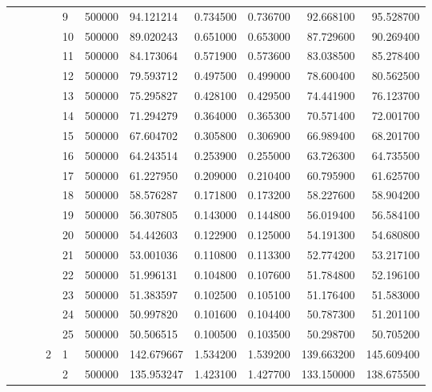\begin{tabular}{lllllllrrrr}
\cline{5-11}
 &  &  &  & 9 & 500000 & 94.121214 & 0.734500 & 0.736700 & 92.668100 & 95.528700 \\
\cline{5-11}
 &  &  &  & 10 & 500000 & 89.020243 & 0.651000 & 0.653000 & 87.729600 & 90.269400 \\
\cline{5-11}
 &  &  &  & 11 & 500000 & 84.173064 & 0.571900 & 0.573600 & 83.038500 & 85.278400 \\
\cline{5-11}
 &  &  &  & 12 & 500000 & 79.593712 & 0.497500 & 0.499000 & 78.600400 & 80.562500 \\
\cline{5-11}
 &  &  &  & 13 & 500000 & 75.295827 & 0.428100 & 0.429500 & 74.441900 & 76.123700 \\
\cline{5-11}
 &  &  &  & 14 & 500000 & 71.294279 & 0.364000 & 0.365300 & 70.571400 & 72.001700 \\
\cline{5-11}
 &  &  &  & 15 & 500000 & 67.604702 & 0.305800 & 0.306900 & 66.989400 & 68.201700 \\
\cline{5-11}
 &  &  &  & 16 & 500000 & 64.243514 & 0.253900 & 0.255000 & 63.726300 & 64.735500 \\
\cline{5-11}
 &  &  &  & 17 & 500000 & 61.227950 & 0.209000 & 0.210400 & 60.795900 & 61.625700 \\
\cline{5-11}
 &  &  &  & 18 & 500000 & 58.576287 & 0.171800 & 0.173200 & 58.227600 & 58.904200 \\
\cline{5-11}
 &  &  &  & 19 & 500000 & 56.307805 & 0.143000 & 0.144800 & 56.019400 & 56.584100 \\
\cline{5-11}
 &  &  &  & 20 & 500000 & 54.442603 & 0.122900 & 0.125000 & 54.191300 & 54.680800 \\
\cline{5-11}
 &  &  &  & 21 & 500000 & 53.001036 & 0.110800 & 0.113300 & 52.774200 & 53.217100 \\
\cline{5-11}
 &  &  &  & 22 & 500000 & 51.996131 & 0.104800 & 0.107600 & 51.784800 & 52.196100 \\
\cline{5-11}
 &  &  &  & 23 & 500000 & 51.383597 & 0.102500 & 0.105100 & 51.176400 & 51.583000 \\
\cline{5-11}
 &  &  &  & 24 & 500000 & 50.997820 & 0.101600 & 0.104400 & 50.787300 & 51.201100 \\
\cline{5-11}
 &  &  &  & 25 & 500000 & 50.506515 & 0.100500 & 0.103500 & 50.298700 & 50.705200 \\
\cline{4-11} \cline{5-11}
 &  &  & \multirow[t]{25}{*}{2} & 1 & 500000 & 142.679667 & 1.534200 & 1.539200 & 139.663200 & 145.609400 \\
\cline{5-11}
 &  &  &  & 2 & 500000 & 135.953247 & 1.423100 & 1.427700 & 133.150000 & 138.675500 \\

\end{tabular}
